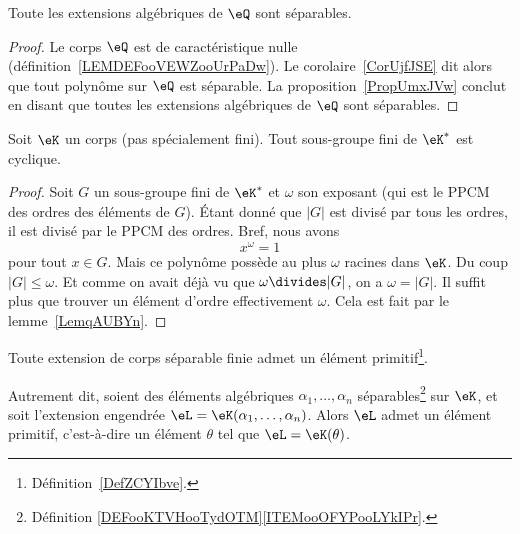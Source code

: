 \begin{corollary}  \label{CORooNZZMooIoBYXY}
    Toute les extensions algébriques de \( \eQ\) sont séparables.
\end{corollary}

\begin{proof}
    Le corps \( \eQ\) est de caractéristique nulle (définition~\ref{LEMDEFooVEWZooUrPaDw}). Le corolaire~\ref{CorUjfJSE} dit alors que tout polynôme sur \( \eQ\) est séparable. La proposition~\ref{PropUmxJVw} conclut en disant que toutes les extensions algébriques de \( \eQ\) sont séparables.
\end{proof}

\begin{theorem}      \label{ThobkwCMm}
    Soit \( \eK\) un corps (pas spécialement fini). Tout sous-groupe fini de \( \eK^*\) est cyclique.
\end{theorem}

\begin{proof}
    Soit \( G\) un sous-groupe fini de \( \eK^*\) et \( \omega\) son exposant (qui est le PPCM des ordres des éléments de \( G\)). Étant donné que \( | G |\) est divisé par tous les ordres, il est divisé par le PPCM des ordres. Bref, nous avons
    \begin{equation}
        x^{\omega}=1
    \end{equation}
    pour tout \( x\in G\). Mais ce polynôme possède au plus \( \omega\) racines dans \( \eK\). Du coup \( | G |\leq \omega\). Et comme on avait déjà vu que \( \omega\divides | G |\), on a \( \omega=| G |\). Il suffit plus que trouver un élément d'ordre effectivement \( \omega\). Cela est fait par le lemme~\ref{LemqAUBYn}.
\end{proof}

\begin{theorem}   \label{ThoORxgBC}
    Toute extension de corps séparable finie admet un élément primitif\footnote{Définition~\ref{DefZCYIbve}.}.

    Autrement dit, soient des éléments algébriques \( \alpha_1,\ldots, \alpha_n\) séparables\footnote{Définition \ref{DEFooKTVHooTydOTM}\ref{ITEMooOFYPooLYkIPr}.} sur \( \eK\), et soit l'extension engendrée \( \eL=\eK(\alpha_1,\ldots, \alpha_n)\). Alors \( \eL \) admet un élément primitif, c'est-à-dire un élément \( \theta \) tel que \( \eL = \eK(\theta)\).
\end{theorem}

